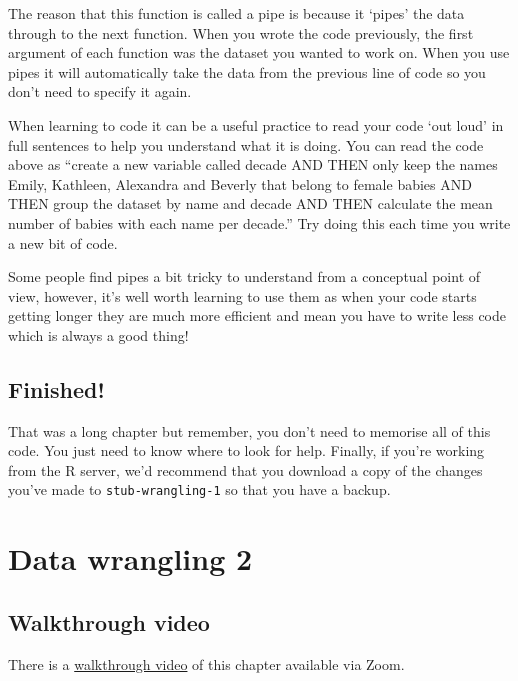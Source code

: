 \documentclass[
  oneside]{book}
\begin{document}
The reason that this function is called a pipe is because it `pipes' the data through to the next function. When you wrote the code previously, the first argument of each function was the dataset you wanted to work on. When you use pipes it will automatically take the data from the previous line of code so you don't need to specify it again.

\begin{try}
When learning to code it can be a useful practice to read your code `out
loud' in full sentences to help you understand what it is doing. You can
read the code above as ``create a new variable called decade AND THEN
only keep the names Emily, Kathleen, Alexandra and Beverly that belong
to female babies AND THEN group the dataset by name and decade AND THEN
calculate the mean number of babies with each name per decade.'' Try
doing this each time you write a new bit of code.
\end{try}

Some people find pipes a bit tricky to understand from a conceptual point of view, however, it's well worth learning to use them as when your code starts getting longer they are much more efficient and mean you have to write less code which is always a good thing!

\hypertarget{finished-2}{%
\section{Finished!}\label{finished-2}}

That was a long chapter but remember, you don't need to memorise all of this code. You just need to know where to look for help. Finally, if you're working from the R server, we'd recommend that you download a copy of the changes you've made to \texttt{stub-wrangling-1} so that you have a backup.

\hypertarget{data-wrangling-2}{%
\chapter{Data wrangling 2}\label{data-wrangling-2}}

\hypertarget{walkthrough-video-3}{%
\section{Walkthrough video}\label{walkthrough-video-3}}

There is a \href{https://uofglasgow.zoom.us/rec/play/Kde7hTS2bAJAvhuAufvxpYi8shgfoSH4kKeWN8YGJ9k1_lbHDFsNzHZBm9Bfu_bKVtcOxoNQbrBf8Ddt.Cy_Kex6M9v1_3v_G?startTime=1602841645000\&_x_zm_rtaid=cW5f8v0JQcOlLI1cBpI84g.1628694791961.c3bcc75dbabdfb3f3ac44f8fd7884865\&_x_zm_rhtaid=355}{walkthrough video} of this chapter available via Zoom.
\end{document}
